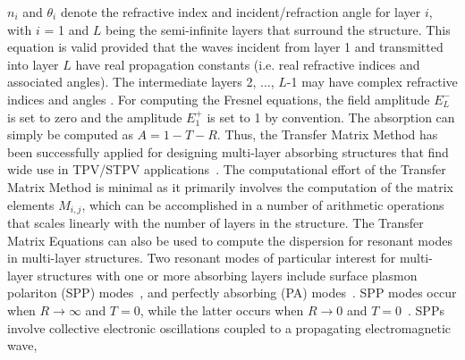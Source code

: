 \documentclass[10pt,letterpaper]{article}
\begin{document}
$n_i$  and $\theta_i$ denote the refractive index 
and incident/refraction angle for layer $i$, with $i$ = 1 and
$L$ being the semi-infinite layers that surround  the structure.  
This equation is valid provided that the waves incident from layer 1 and
transmitted into layer $L$ have real propagation constants (i.e. real refractive
indices and associated angles).  The intermediate layers 2, ..., $L$-1 may have complex refractive
indices and angles \cite{Yeh}.
For computing the Fresnel equations, 
the field amplitude $E_L^-$ is set to zero and the amplitude $E_1^+$ is set to 1 by convention.   
The absorption can simply be computed as $A= 1-T-R$.  
Thus, the Transfer Matrix Method has been successfully applied for 
designing multi-layer absorbing structures that find wide use in TPV/STPV applications~\cite{BN_JApplPhys_2005,LZ_JApplPhys_2006,FUS_OptExp_2015}.
The computational effort of the Transfer Matrix Method is minimal as it primarily involves the computation of the matrix elements $M_{i,j}$, which can 
be accomplished in a number of arithmetic operations that scales linearly with the number of layers in the structure.
The Transfer Matrix Equations can also be used to compute the dispersion for resonant modes in multi-layer structures.  Two
resonant modes of particular interest for multi-layer structures with one or more absorbing layers include surface plasmon polariton 
(SPP) modes~\cite{WH_PSSb_1987,Maier,Novotny,AP_NatMat_2010,FHR_SciRep_2015}, 
and perfectly absorbing (PA) modes~\cite{DD_APL_2009,KSL_APL_2012,
KBG_NatMat_2013,FHR_SciRep_2015}.  SPP modes occur 
when $R \rightarrow \infty$ and   $T=0$, while the 
latter occurs
when $R \rightarrow 0$ and   $T=0$~\cite{FHR_SciRep_2015}.  SPPs involve collective electronic oscillations coupled to a propagating electromagnetic wave,
\end{document}
